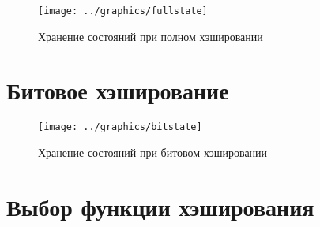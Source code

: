 \begin{figure}[ht]
  \centering
  \texttt{[image: ../graphics/fullstate]}
  \caption{Хранение состояний при полном хэшировании}
  \label{fig:fullstate}
\end{figure}

\section{Битовое хэширование}
\label{sec:bithash-store}

\begin{figure}[ht]
  \centering
  \texttt{[image: ../graphics/bitstate]}  
  \caption{Хранение состояний при битовом хэшировании}
  \label{fig:bitstate}
\end{figure}

\section{Выбор функции хэширования}
\label{sec:hashing-function}


